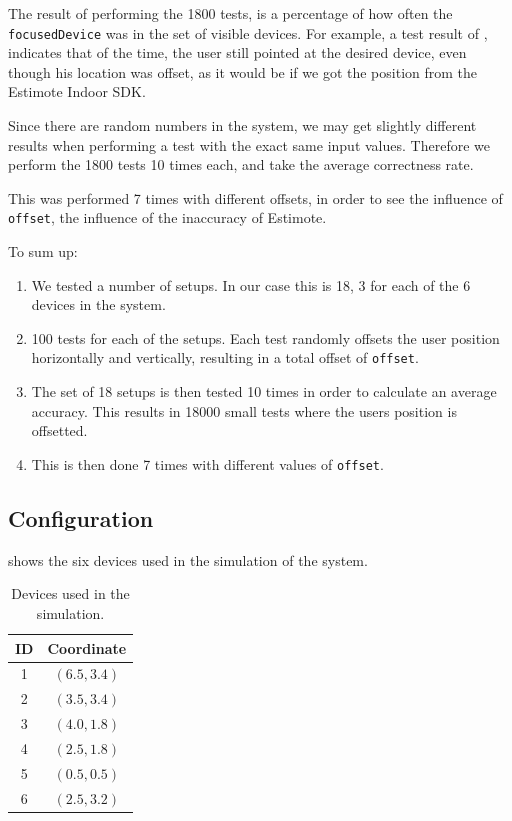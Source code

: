 The result of performing the \num{1800} tests, 
is a percentage of how often the \texttt{focusedDevice} was in the set of visible devices. 
For example, a test result of , 
indicates that  of the time, 
the user still pointed at the desired device, 
even though his location was offset, 
as it would be if we got the position from the Estimote Indoor SDK.

Since there are random numbers in the system, 
we may get slightly different results when performing a test with the exact same input values. 
Therefore we perform the \num{1800} tests \num{10} times each, 
and take the average correctness rate.

This was performed \num{7} times with different offsets, 
in order to see the influence of \texttt{offset},
\ie the influence of the inaccuracy of Estimote.

To sum up:
\begin{enumerate}
\item We tested a number of setups. In our case this is \num{18}, \num{3} for each of the \num{6} devices in the system.
\item \num{100} tests for each of the setups. Each test randomly offsets the user position horizontally and vertically, resulting in a total offset of \texttt{offset}.
\item The set of \num{18} setups is then tested \num{10} times in order to calculate an average accuracy. This results in \num{18000} small tests where the users position is offsetted.
\item This is then done \num{7} times with different values of \texttt{offset}.
\end{enumerate}

\subsection{Configuration}

 shows the six devices used in the simulation of the system.

\begin{table}[!hbt]
\centering
\caption{Devices used in the simulation.}
\label{tbl:evaluation:system-correctness:devices}
\begin{tabular}{c|c}
	ID &  Coordinate   \\ \hline
	1  & $(6.5, 3.4)$  \\
	2  & $(3.5 , 3.4)$ \\
	3  & $(4.0 , 1.8)$ \\
	4  & $(2.5 , 1.8)$ \\
	5  & $(0.5 , 0.5)$ \\
	6  & $(2.5 , 3.2)$
\end{tabular}
\end{table}

